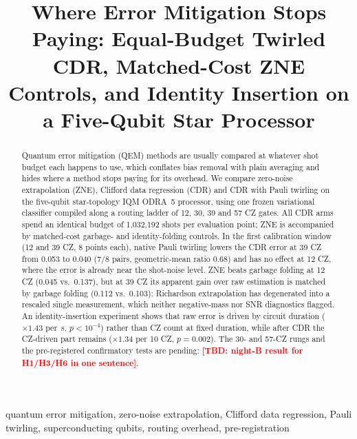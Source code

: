 \documentclass[conference]{IEEEtran}
\newcommand{\TBD}[1]{\textcolor{red}{\textbf{[TBD: #1]}}}
\begin{document}
\title{Where Error Mitigation Stops Paying: Equal-Budget Twirled CDR, Matched-Cost ZNE
Controls, and Identity Insertion on a Five-Qubit Star Processor}

\author{
}

\maketitle

\begin{abstract}
Quantum error mitigation (QEM) methods are usually compared at whatever shot budget each
happens to use, which conflates bias removal with plain averaging and hides where a method
stops paying for its overhead. We compare zero-noise extrapolation (ZNE), Clifford data
regression (CDR) and CDR with Pauli twirling on the five-qubit star-topology IQM ODRA~5
processor, using one frozen variational classifier compiled along a routing ladder of
12, 30, 39 and 57 CZ gates. All CDR arms spend an identical budget of 1,032,192 shots per
evaluation point; ZNE is accompanied by matched-cost garbage- and identity-folding controls.
In the first calibration window (12 and 39 CZ, 8 points each), native Pauli twirling lowers
the CDR error at 39 CZ from 0.053 to 0.040 (7/8 pairs, geometric-mean ratio 0.68) and has no
effect at 12 CZ, where the error is already near the shot-noise level. ZNE beats garbage
folding at 12 CZ (0.045 vs.\ 0.137), but at 39 CZ its apparent gain over raw estimation is
matched by garbage folding (0.112 vs.\ 0.103): Richardson extrapolation has degenerated into a
rescaled single measurement, which neither negative-mass nor SNR diagnostics flagged. An
identity-insertion experiment shows that raw error is driven by circuit duration
($\times1.43$ per~\textmu s, $p<10^{-4}$) rather than CZ count at fixed duration, while after
CDR the CZ-driven part remains ($\times1.34$ per 10 CZ, $p=0.002$). The 30- and 57-CZ rungs
and the pre-registered confirmatory tests are pending: \TBD{night-B result for H1/H3/H6 in one
sentence}.
\end{abstract}

\begin{IEEEkeywords}
quantum error mitigation, zero-noise extrapolation, Clifford data regression, Pauli
twirling, superconducting qubits, routing overhead, pre-registration
\end{IEEEkeywords}
\end{document}
